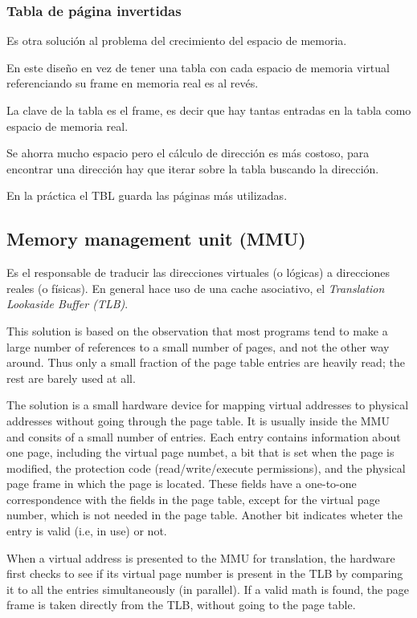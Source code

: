 \documentclass[a4paper, twoside]{article}
\begin{document}
\subsubsection{Tabla de página invertidas}

Es otra solución al problema del crecimiento del espacio de memoria.

En este diseño en vez de tener una tabla con cada espacio de memoria virtual
referenciando su frame en memoria real es al revés.

La clave de la tabla es el frame, es decir que hay tantas entradas en la tabla
como espacio de memoria real.

Se ahorra mucho espacio pero el cálculo de dirección es más costoso, para
encontrar una dirección hay que iterar sobre la tabla buscando la dirección.

En la práctica el TBL guarda las páginas más utilizadas.

\subsection{Memory management unit (MMU)}

Es el responsable de traducir las direcciones virtuales (o lógicas) a
direcciones reales (o físicas).
En general hace uso de una cache asociativo, el \emph{Translation Lookaside
Buffer (TLB)}.

This solution is based on the observation that most programs tend to make a
large number of references to a small number of pages, and not the other way
around.
Thus only a small fraction of the page table entries are heavily read;
the rest are barely used at all.

The solution is a small hardware device for mapping virtual addresses to
physical addresses without going through the page table.
It is usually inside the MMU and consits of a small number of entries.
Each entry contains information about one page, including the virtual page
numbet, a bit that is set when the page is modified, the protection code
(read/write/execute permissions), and the physical page frame in which the
page is located.
These fields have a one-to-one correspondence with the fields in the page
table, except for the virtual page number, which is not needed in the page
table. Another bit indicates wheter the entry is valid (i.e, in use) or not.

When a virtual address is presented to the MMU for translation, the hardware
first checks to see if its virtual page number is present in the TLB by
comparing it to all the entries simultaneously (in parallel).
If a valid math is found, the page frame is taken directly from the TLB,
without going to the page table.
\end{document}
